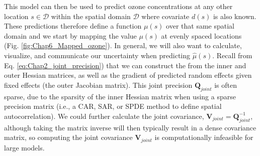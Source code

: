 This model can then be used to predict ozone concentrations at any other location \(s \in \mathcal{D} \) within the spatial domain \(\mathcal{D}\) where covariate \(d(s)\) is also known.  These predictions therefore define a function \( \mu(s) \) over that same spatial domain and we start by mapping the value \( \mu(s) \) at evenly spaced locations (Fig. \ref{fig:Chap6_Mapped_ozone}).  In general, we will also want to calculate, visualize, and communicate our uncertainty when predicting \( \hat\mu(s) \).  Recall from Eq. \ref{eq:Chap2_joint_precision}) that we can construct the  from the inner and outer Hessian matrices, as well as the gradient of predicted random effects given fixed effects (the outer Jacobian matrix).  This joint precision \(\mathbf Q_{joint}\) is often sparse, due to the sparsity of the inner Hessian matrix when using a sparse precision matrix (i.e., a CAR, SAR, or SPDE method to define spatial autocorrelation).  We could further calculate the joint covariance, \( \mathbf V_{joint} = \mathbf Q_{joint}^{-1} \), although taking the matrix inverse will then typically result in a dense covariance matrix, so computing the joint covariance \(\mathbf V_{joint} \) is computationally infeasible for large models.

